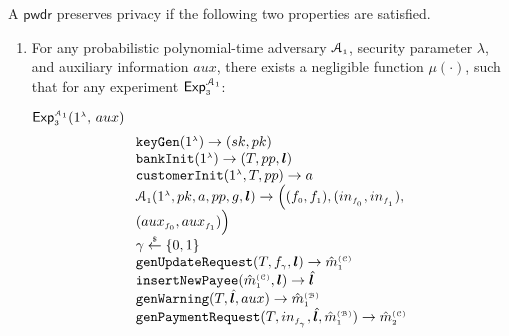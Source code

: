 


\begin{definition}[Privacy]\label{def::privacy} A $\mathsf{pwdr}$ preserves privacy if  the following two properties are satisfied.
\begin{enumerate}

\item For any probabilistic polynomial-time  adversary $\mathcal{A}_{\scriptscriptstyle 1}$,  security parameter $\lambda$, and  auxiliary information $aux$, there exists a negligible function $\mu(\cdot)$, such that for any  experiment $\mathsf{Exp}_{\scriptscriptstyle 3}^{\mathcal{A}_{\scriptscriptstyle 1}}$:


\begin{center}
{\small{
\begin{mybox}[colback=white,  width=74.5mm, height=73mm, left=-2mm, drop fuzzy shadow southwest]{$\mathsf{Exp}_{\st 3}^{\st\mathcal{A}_{\st 1}}(1^{\st\lambda}\text{, }  {aux})$}
$$
  \begin{array}{l}
%
 \mathtt{keyGen}(1^{\st\lambda})\rightarrow (sk,pk)\\
%
  \mathtt{bankInit}(1^{\st \lambda})\rightarrow (T, pp, \bm{l})\\
%
\mathtt{customerInit} (1^{\st \lambda}, T, pp)\rightarrow a\\
%
\mathcal{A}_{\st 1}(1^{\st \lambda}, pk, a, pp, g, \bm{l})\rightarrow \Big((f_{\st 0}, f_{\st 1}),(in_{\st f_{\st_{\st 0}}},in_{\st f_{\st _1}}),\\({aux}_{\st f_{0}},{aux}_{\st f_{\st1}})\Big)\\
%
\gamma\stackrel{\st \$}\leftarrow\{0,1\}\\
%
\mathtt{genUpdateRequest}(T, f_{\st \gamma}, {\bm l})\rightarrow \hat m^{\st\mathcal{(C)}}_{\st 1}\\
%
\mathtt{insertNewPayee}(\hat{m}^{\st\mathcal{(C)}}_{\st 1}, {\bm l})\rightarrow  \hat{\bm l}\\
%
\mathtt{genWarning}(T, \hat{\bm l}, {aux})\rightarrow \hat m^{\st\mathcal{(B)}}_{\st1}\\
%
\mathtt{genPaymentRequest}(T, in_{\st f_{_\gamma}}, \hat{\bm{l}}, \hat m^{\st\mathcal{(B)}}_{\st1})\rightarrow \hat m^{\st\mathcal{(C)}}_{\st2}\\

\end{array}$$
\end{mybox}}}
\end{center}
\end{enumerate}
\end{definition}
